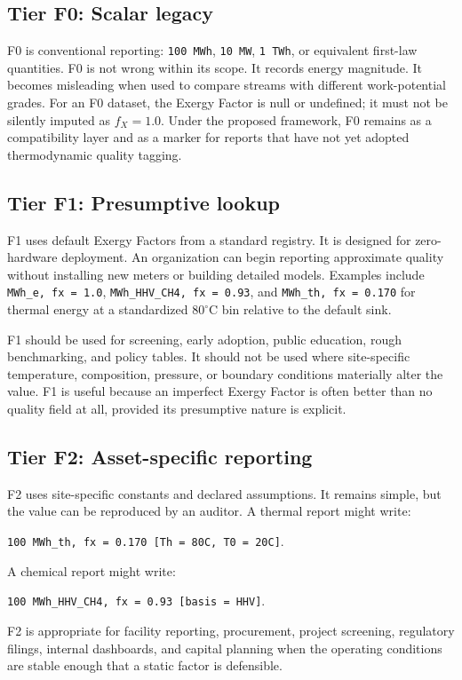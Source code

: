 \documentclass[11pt]{article}
\newcommand{\fx}{f_X}
\newcommand{\degC}{^{\circ}\mathrm{C}}
\begin{document}
\subsection{Tier F0: Scalar legacy}

F0 is conventional reporting: \texttt{100 MWh}, \texttt{10 MW}, \texttt{1 TWh}, or equivalent first-law quantities. F0 is not wrong within its scope. It records energy magnitude. It becomes misleading when used to compare streams with different work-potential grades. For an F0 dataset, the Exergy Factor is null or undefined; it must not be silently imputed as $\fx=1.0$. Under the proposed framework, F0 remains as a compatibility layer and as a marker for reports that have not yet adopted thermodynamic quality tagging.

\subsection{Tier F1: Presumptive lookup}

F1 uses default Exergy Factors from a standard registry. It is designed for zero-hardware deployment. An organization can begin reporting approximate quality without installing new meters or building detailed models. Examples include \texttt{MWh\_e, fx = 1.0}, \texttt{MWh\_HHV\_CH4, fx = 0.93}, and \texttt{MWh\_th, fx = 0.170} for thermal energy at a standardized $80\degC$ bin relative to the default sink.

F1 should be used for screening, early adoption, public education, rough benchmarking, and policy tables. It should not be used where site-specific temperature, composition, pressure, or boundary conditions materially alter the value. F1 is useful because an imperfect Exergy Factor is often better than no quality field at all, provided its presumptive nature is explicit.

\subsection{Tier F2: Asset-specific reporting}

F2 uses site-specific constants and declared assumptions. It remains simple, but the value can be reproduced by an auditor. A thermal report might write:
\begin{center}
\texttt{100 MWh\_th, fx = 0.170 [Th = 80C, T0 = 20C]}.
\end{center}
A chemical report might write:
\begin{center}
\texttt{100 MWh\_HHV\_CH4, fx = 0.93 [basis = HHV]}.
\end{center}
F2 is appropriate for facility reporting, procurement, project screening, regulatory filings, internal dashboards, and capital planning when the operating conditions are stable enough that a static factor is defensible.
\end{document}
